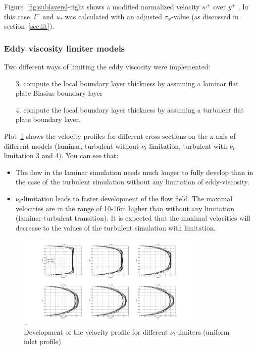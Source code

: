 \documentclass[11pt,a4paper]{article}
\begin{document}
\noindent Figure~\ref{fig:sublayers}-right shows a modified normalized velocity $w^+$ over $y^+$ . In this case, $l^+$ and $u_{\tau}$ was calculated with an adjusted $\tau_w$-value (as discussed in section~\ref{sec:lit}).

\subsubsection{Eddy viscosity limiter models}

Two different ways of limiting the eddy viscosity were implemented:
\begin{itemize}
\item[3.] compute the local boundary layer thickness by assuming a laminar flat plate Blasius boundary layer
\item[4.] compute the local boundary layer thickness by assuming a turbulent flat plate boundary layer.
\end{itemize}

\noindent Plot~\ref{fig:devel} shows the velocity profiles for different cross sections on the x-axis of different models (laminar, turbulent without $\nu_t$-limitation, turbulent with $\nu_t$-limitation 3 and 4). You can see that:
\begin{itemize}
\item The flow in the laminar simulation needs much longer to fully develop than in the case of the turbulent simulation without any limitation of eddy-viscosity.
\item $\nu_t$-limitation leads to faster development of the flow field. The maximal velocities are in the range of 10-16m higher than without any limitation (laminar-turbulent transition). It is expected that the maximal velocities will decrease to the values of the turbulent simulation with limitation.
\end{itemize}

\begin{figure}[h]
    \centering
    \includegraphics[trim={5cm 1.5cm 4cm 1.5cm},clip,angle=90,origin=c, width=0.8\textwidth]{yu}
    \caption{Development of the velocity profile for different $\nu_t$-limiters (uniform inlet profile)}
    \label{fig:devel}
\end{figure}
\end{document}
